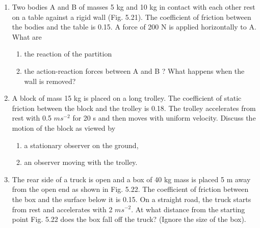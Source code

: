 \begin{enumerate}[label=\arabic*.,ref=\thesection.\theenumi]
\item Two bodies A and B of masses 5 kg and 10 kg in contact with each other rest on a table against a rigid wall (Fig. 5.21). The coefficient of friction between the bodies and the table is 0.15. A force of 200 N is applied horizontally to A. What are 
\begin{enumerate}
\item the reaction of the partition 
\item the action-reaction forces between A and B ? What happens when the wall is removed? 
\end{enumerate}
\item A block of mass 15 kg is placed on a long trolley. The coefficient of static friction between the block and the trolley is 0.18. The trolley accelerates from rest with 0.5 $m s^{-2}$
for 20 s and then moves with uniform velocity. Discuss the motion of the
block as viewed by 
\begin{enumerate}
\item a stationary observer on the ground, 
\item an observer moving with the trolley.
\end{enumerate}
\item The rear side of a truck is open and a box of 40 kg mass is placed 5 m away from the open end as shown in Fig. 5.22. The coefficient of friction between the box and the surface below it is 0.15. On a straight road, the truck starts from rest and accelerates with 2 $m s^{-2}$. At what distance from the starting point Fig. 5.22
does the box fall off the truck? (Ignore the size of the box).
\end{enumerate}

